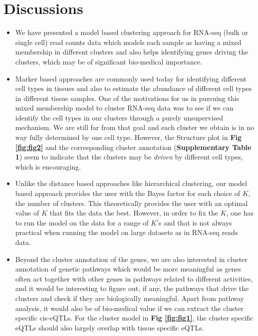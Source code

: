 \section{Discussions}

\begin{itemize}

\item We have presented a model based clustering approach for RNA-seq (bulk or single cell) read counts data which models each sample as having a mixed membership in different clusters and also helps identifying genes driving the clusters, which may be of significant bio-medical importance. 

\item Marker based approaches are commonly used today for identifying different cell types in tissues and also to estimate the abundance of different cell types in different tissue samples. One of the motivations for us in pursuing this mixed membership model to cluster RNA-seq data was to see if we can identify the cell types in our clusters through a purely unsupervised mechanism. We are still far from that goal and each cluster we obtain is in no way fully determined by one cell type.  However, the Structure plot in  \textbf{Fig \ref{fig:fig2}} and the corresponding cluster annotation (\textbf{Supplementary Table 1}) seem to indicate that the clusters may be \textit{driven} by different cell types, which is encouraging.

\item Unlike the distance based approaches like hierarchical clustering, our model based approach provides the user with the Bayes factor for each choice of $K$, the number of clusters. This theoretically provides the user with an optimal value of $K$ that fits the data the best. However, in order to fix the $K$, one has to run the model on the data for a range of $K$'s and that is not always practical when running the model on large datasets as in RNA-seq reads data. 

\item Beyond the cluster annotation of the genes, we are also interested in cluster annotation of genetic pathways which would be more meaningful as genes often act together with other genes in pathways related to different activities, and it would be interesting to figure out, if any, the pathways that drive the clusters and check if they are biologically meaningful. Apart from pathway analysis, it would also be of bio-medical value if we can extract the cluster specific cis-eQTLs. For the cluster model in  \textbf{Fig \ref{fig:fig1}}, the cluster specific eQTLs should also largely overlap with tissue specific eQTLs.


\end{itemize}
